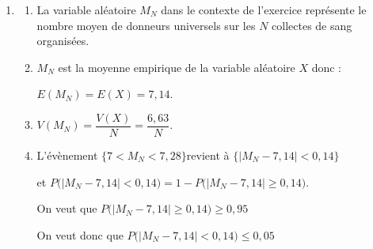 \begin{enumerate}
\begin{enumerate}
La variable aléatoire $X$ compte le nombre de succès.

Donc $X$ suit une loi binomiale de paramètres $n=100$ et $p=\np{0,0714}$.
		\item $P(X \leq 7 ) \approx \np{0,57714}$.

À $10^{-3}$ près, la probabilité  qu'il y ait au plus 7 donneurs universels dans cet échantillon vaut $0,577$.
		\item  $X$ suit une loi binomiale de paramètres $n=100$ et $p=\np{0,0714}$ donc :

$\begin{aligned}[t] E(X)& =n \times p \\&= 100 \times 0,0714\\&=7,14\end{aligned}$
	\hfill~
$\begin{aligned}[t] V(X)& = n \times p \times (1-p)\\& = 100 \times 0,0714 \times (1- 0,714) \\& = \np{6,630204}\\
	& 	\approx 6,63\quad\text{ à }10^{-2} \text{ près.}
\end{aligned}$
\hfill~
	\end{enumerate}
\item
	
	
	
	
	
	\begin{enumerate}
		\item  La variable aléatoire $M_{N}$ dans le contexte de l'exercice représente le nombre moyen de donneurs universels sur les $N$ collectes de sang organisées.

		\item  $M_N$ est la moyenne empirique de la variable aléatoire $X$ donc :
		
$E\left(M_{N}\right)=E(X) =7,14$.
		\item

$V\left(M_{N}\right)=\dfrac{V(X)}{N}= \dfrac{6,63}{N}$.
		\item L'évènement \quad $\big\{ 7<M_{N}<7,28 \big\}$\quad revient à \quad $\big\{\big|M_{N} - 7,14\big| < 0,14\big\}$

et \quad $P\Big(\big|M_N - 7,14 \big| < 0,14\Big) = 1 - P\Big(\big|M_{N} - 7,14 \big| \geqslant 0,14\Big)$.

On veut que $P\Big(\big|M_{N} - 7,14 \big| \geqslant 0,14\Big) \geqslant 0,95$

On veut donc que $P\Big(\big|M_N - 7,14 \big| < 0,14\Big) \leqslant 0,05$


\end{enumerate}
\end{enumerate}
